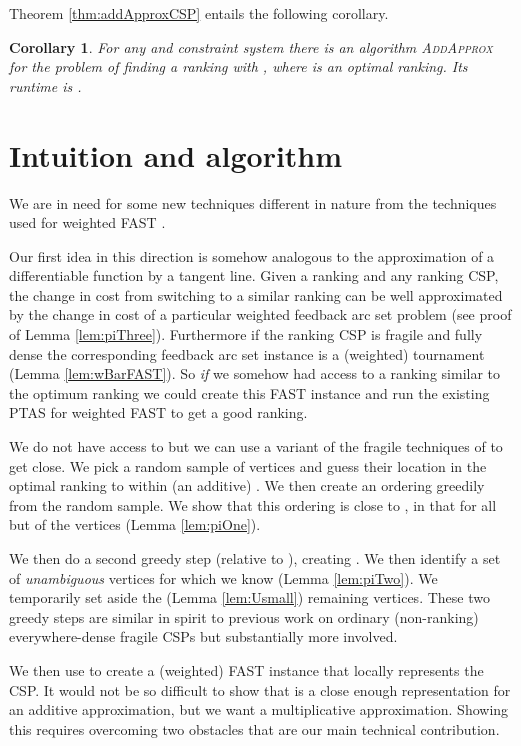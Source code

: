 \documentclass[dvips,11pt,letter]{article}
\newtheorem{corollary}[theorem]{Corollary}
\newcommand{\addApprox}{\textsc{AddApprox}}
\newcommand{\fast}{\textsc{FAST}}
\begin{document}
{Theorem \ref{thm:addApproxCSP} entails the following corollary.

\begin{corollary}\label{thm:addApproxRank}
For any  and constraint system  there is an algorithm \addApprox{} for the problem of finding a ranking  with , where  is an optimal ranking. Its runtime is .
\end{corollary}

\section{Intuition and algorithm}\label{sec:algo}

We are in need for some new techniques different in nature from the techniques used for weighted FAST \cite{mathieu09fast}.

Our first idea in this direction is somehow analogous to the approximation of a differentiable function by a tangent line. Given a ranking  and any ranking CSP, the change in cost from switching to a similar ranking  can be well approximated by the change in cost of a particular weighted feedback arc set problem (see proof of Lemma \ref{lem:piThree}). Furthermore if the ranking CSP is fragile and fully dense the corresponding feedback arc set instance is a (weighted) tournament (Lemma \ref{lem:wBarFAST}). So \emph{if} we somehow had access to a ranking similar to the optimum ranking  we could create this FAST instance and run the existing PTAS for weighted \fast{} \cite{mathieu09fast} to get a good ranking.

We do not have access to  but we can use a variant of the fragile techniques of \cite{KS09} to get close. We pick a random sample of vertices and guess their location in the optimal ranking to within (an additive) . We then create an ordering  greedily from the random sample.
We show that this ordering is close to , in that  for all but  of the vertices (Lemma \ref{lem:piOne}).

We then do a second greedy step (relative to ), creating . We then identify a set  of \emph{unambiguous} vertices for which we know  (Lemma \ref{lem:piTwo}). We temporarily set aside the  (Lemma \ref{lem:Usmall}) remaining vertices. These two greedy steps are similar in spirit to previous work on ordinary (non-ranking) everywhere-dense fragile CSPs \cite{KS09} but substantially more involved.

We then use  to create a (weighted) \fast{} instance  that locally represents the CSP. It would not be so difficult to show that  is a close enough representation for an additive approximation, but we want a multiplicative  approximation. Showing this requires overcoming two obstacles that are our main technical contribution.

}
\end{document}
